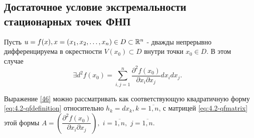 \subsection{Достаточное условие экстремальности стационарных точек ФНП}

Пусть $u = f(x), x = (x_1, x_2, \ldots, x_n) \in D \subset \mathbb{R}^n$ - дважды непрерывно дифференцируема в окрестности $V(x_0) \subset D$ внутри точки $x_0 \in D$. В этом случае
\begin{equation}
\label{46}
\exists d^2 f(x_0) = \sum\limits_{i,j=1}^{n} \dfrac{\partial^2 f(x_0)}{\partial x_i \partial x_j} d x_i d x_j.
\end{equation}

Выражение \eqref{46} можно рассматривать как соответствующую квадратичную форму \eqref{eq:4.2-qfdefinition} относительно $h_k = d x_k, k = \overline{1,n}$, с матрицей \eqref{eq:4.2-qfmatrix} этой формы $A = \left( \dfrac{\partial^2 f(x_0)}{\partial x_i \partial x_j} \right),$  $ i = \overline{1,n}, $  $j = \overline{1,n}$.

